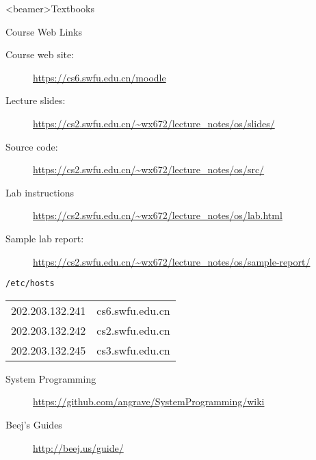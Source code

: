 \mode*
{}


\begin{frame}<beamer>{Textbooks}
  \begin{refsection}
    \nocite{tanenbaum2008modern, silberschatz11essentials, bovet2005understanding,
      cs241, zhenggang2016, linuxkernelart13, yuyuan2009orange}%
    \printbibliography[heading=none]
  \end{refsection}
\end{frame}

\begin{frame}{Course Web Links}
  \begin{description}
  \item[Course web site:] \url{https://cs6.swfu.edu.cn/moodle}
  \item[Lecture slides:] \url{https://cs2.swfu.edu.cn/~wx672/lecture_notes/os/slides/}
  \item[Source code:] \url{https://cs2.swfu.edu.cn/~wx672/lecture_notes/os/src/}
  \item[Lab instructions] \url{https://cs2.swfu.edu.cn/~wx672/lecture_notes/os/lab.html}
  \item[Sample lab report:] \url{https://cs2.swfu.edu.cn/~wx672/lecture_notes/os/sample-report/}
  \end{description}
    \begin{block}{\texttt{/etc/hosts}}
    \ttfamily
    \begin{tabular}{ll}
      202.203.132.241&cs6.swfu.edu.cn\\      
      202.203.132.242&cs2.swfu.edu.cn\\
      202.203.132.245&cs3.swfu.edu.cn\\      
    \end{tabular}
  \end{block}\footnotesize
  \begin{description}
  \item[System Programming] \url{https://github.com/angrave/SystemProgramming/wiki}
  \item[Beej's Guides] \url{http://beej.us/guide/}
  \end{description}
\end{frame}

